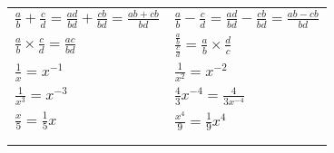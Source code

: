 \documentclass[../main.tex]{subfiles}
\begin{document}
\begin{tabularx}{1\textwidth} { 
    >{\centering\arraybackslash}X 
    >{\centering\arraybackslash}X  }
    \begin{math}
        \frac{a}{b} + \frac{c}{d} = \frac{ad}{bd} + \frac{cb}{bd} = \frac{ab+cb}{bd}
    \end{math}
    &
    \begin{math}
        \frac{a}{b} - \frac{c}{d} = \frac{ad}{bd} - \frac{cb}{bd} = \frac{ab-cb}{bd}
    \end{math}
    \\ [7pt]
    \begin{math}
        \frac{a}{b} \times \frac{c}{d} = \frac{ac}{bd}
    \end{math}
    &
    \begin{math}
       \frac{\frac{a}{b}}{\frac{c}{d}} = \frac{a}{b} \times \frac{d}{c}
    \end{math}
    \\ [7pt]
    \begin{math}
        \frac{1}{x} = x^{-1}
    \end{math}
    &
    \begin{math}
        \frac{1}{x^2} = x^{-2}
    \end{math}
    \\ [7pt]
    \begin{math}
        \frac{1}{x^3} = x^{-3}
    \end{math}
    &
    \begin{math}
        \frac{4}{3}x^{-4} = \frac{4}{3x^{-4}}
    \end{math}
    \\ [7pt]
    \begin{math}
        \frac{x}{5} = \frac{1}{5}x
    \end{math}
    &
    \begin{math}
        \frac{x^4}{9} = \frac{1}{9}x^4
    \end{math}
    \\ [7pt]
    \begin{math}
        {}
    \end{math}
    &
    \begin{math}
        {}
    \end{math}
    \\ [7pt]
    \begin{math}
        {}
    \end{math}
    &
    \begin{math}
        {}
    \end{math}
    \\ [7pt]
\end{tabularx}
\end{document}

